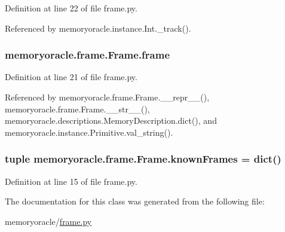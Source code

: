 Definition at line 22 of file frame.\+py.



Referenced by memoryoracle.\+instance.\+Int.\+\_\+track().

\hypertarget{classmemoryoracle_1_1frame_1_1Frame_a1c23d6d73253d8f94ecbf22fc811288e}{}
\subsubsection[{frame}]{\setlength{\rightskip}{0pt plus 5cm}memoryoracle.\+frame.\+Frame.\+frame}\label{classmemoryoracle_1_1frame_1_1Frame_a1c23d6d73253d8f94ecbf22fc811288e}


Definition at line 21 of file frame.\+py.



Referenced by memoryoracle.\+frame.\+Frame.\+\_\+\+\_\+repr\+\_\+\+\_\+(), memoryoracle.\+frame.\+Frame.\+\_\+\+\_\+str\+\_\+\+\_\+(), memoryoracle.\+descriptions.\+Memory\+Description.\+dict(), and memoryoracle.\+instance.\+Primitive.\+val\+\_\+string().

\hypertarget{classmemoryoracle_1_1frame_1_1Frame_acd184cbe6ec2c834edbc7e737d9985f7}{}
\subsubsection[{known\+Frames}]{\setlength{\rightskip}{0pt plus 5cm}tuple memoryoracle.\+frame.\+Frame.\+known\+Frames = dict()\hspace{0.3cm}{\ttfamily [static]}}\label{classmemoryoracle_1_1frame_1_1Frame_acd184cbe6ec2c834edbc7e737d9985f7}


Definition at line 15 of file frame.\+py.



The documentation for this class was generated from the following file\+:\begin{DoxyCompactItemize}
\item 
memoryoracle/\hyperlink{frame_8py}{frame.\+py}\end{DoxyCompactItemize}

